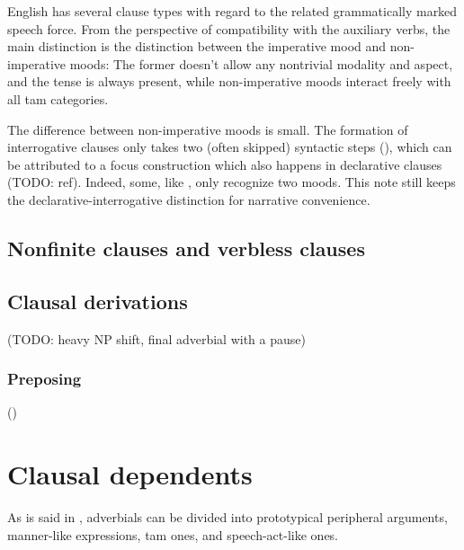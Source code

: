 \documentclass[UTF8, a4paper, oneside, scheme=plain]{ctexrep}
\newcommand*{\citepage}[1]{pp.~{#1}}
\begin{document}
English has several clause types with regard to the related grammatically marked speech force.
From the perspective of compatibility with the auxiliary verbs,
the main distinction is the distinction between the imperative mood and non-imperative moods:
The former doesn't allow any nontrivial modality and aspect,
and the tense is always present,
while non-imperative moods interact freely with all \acs{tam} categories.

The difference between non-imperative moods is small.
The formation of interrogative clauses 
only takes two (often skipped) syntactic steps 
(),
which can be attributed to a focus construction which also happens in declarative clauses (TODO: ref).
Indeed, some, like \citet[\citepage{25}]{dixon2005semantic}, only recognize two moods.
This note still keeps the declarative-interrogative distinction 
for narrative convenience.

\subsection{Nonfinite clauses and verbless clauses}\label{sec:simple-clause.nonfinite-clause}

\subsection{Clausal derivations}\label{sec:simple-clause.derivation}

(TODO: heavy NP shift, final adverbial with a pause)

\subsubsection{Preposing}\label{sec:simple-clause.derivation.preposing}

()

\section{Clausal dependents}\label{sec:simple-clause.dependents}

As is said in ,
adverbials can be divided into 
prototypical peripheral arguments,
manner-like expressions, 
\acs{tam} ones, and speech-act-like ones.
\end{document}
